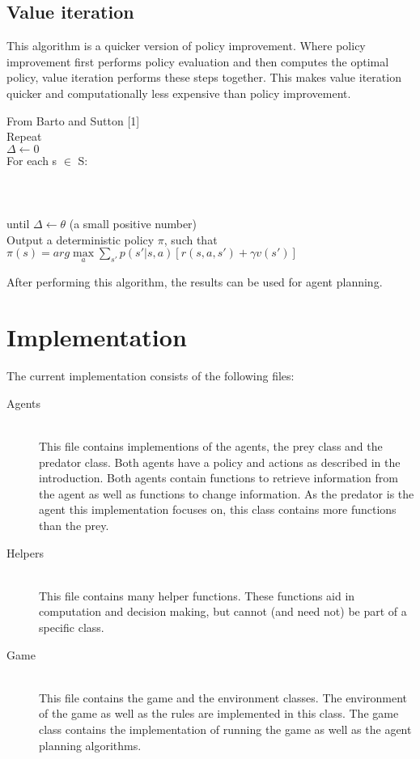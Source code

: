 \documentclass{article}
\newcommand{\tab}[1]{\hspace{10 mm}\rlap{#1}}
\begin{document}
\subsection*{Value iteration}
This algorithm is a quicker version of policy improvement. Where policy improvement first performs policy evaluation and then computes the optimal policy, value iteration performs these steps together. This makes value iteration quicker and computationally less expensive than policy improvement.

\begin{algorithm}[H]
From Barto and Sutton [1]\\
Repeat \\
$\Delta \leftarrow 0$ \\
For each s $\in$ S: \\
\tab{$temp \leftarrow v(s)$} \\
\tab{$v(s) \leftarrow \max\limits_a \sum_{s'} p(s'|s, a)[r(s, a, s') + \gamma v(s')]$} \\
\tab{$\Delta \leftarrow max(temp, |v(s)|)$} \\
until $\Delta \leftarrow \theta$ (a small positive number)\\

Output a deterministic policy $\pi$, such that \\
$\pi (s) = arg \max\limits_a \sum_{s'} p(s'|s, a)[r(s, a, s') + \gamma v(s')]$
\end{algorithm}

After performing this algorithm, the results can be used for agent planning.

\section*{Implementation}
The current implementation consists of the following files:
\begin{description}
	\item[Agents] \hfill \\ 
	This file contains implementions of the agents, the prey class and the predator class. Both agents have a policy and actions as described in the introduction. Both agents contain functions to retrieve information from the agent as well as functions to change information. As the predator is the agent this implementation focuses on, this class contains more functions than the prey.
	
	\item[Helpers] \hfill \\ 
	This file contains many helper functions. These functions aid in computation and decision making, but cannot (and need not) be part of a specific class.
	
	\item[Game] \hfill \\ 
	This file contains the game and the environment classes. The environment of the game as well as the rules are implemented in this class. The game class contains the implementation of running the game as well as the agent planning algorithms.
\end{description}
\end{document}
